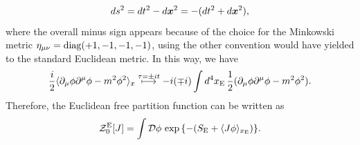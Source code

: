 \begin{equation}
    ds^2 = dt^2 - d\bm{x}^2 = -(dt^2 + d\bm{x}^2),
\end{equation}
where the overall minus sign appears because of the choice for the Minkowski metric $\eta_{\mu\nu} = \mathrm{diag}{(+1,-1,-1,-1)}$, using the other convention would have yielded to the standard Euclidean metric. In this way, we have 
\begin{equation}
    \frac{i}{2}\langle \partial_\mu\phi\partial^\mu\phi - m^2\phi^2 \rangle_x \overset{\tau = \pm it}{\longmapsto} -i(\mp i)\int d^4x_{\mathrm{E}}\,\frac{1}{2}(\partial_\mu\phi\partial^\mu\phi - m^2\phi^2).
\end{equation}
Therefore, the Euclidean free partition function can be written as 
\begin{equation}
    \mathcal{Z}^{\mathrm{E}}_0[J] = \int \mathcal{D}\phi\,\exp{\{-(S_{\mathrm{E}} + \langle J\phi \rangle_{x_{\mathrm{E}}})\}}.
\end{equation}

